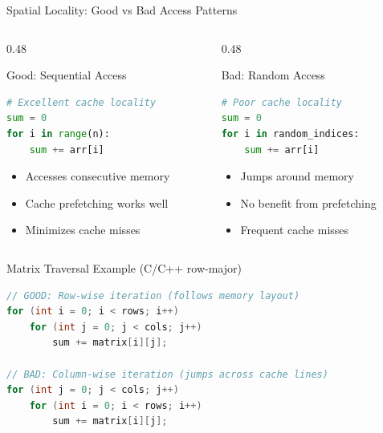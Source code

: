 \documentclass[aspectratio=169,xcolor=dvipsnames]{beamer}
\begin{document}
\begin{frame}[fragile]{Spatial Locality: Good vs Bad Access Patterns}
  \begin{columns}
    \begin{column}{0.48\textwidth}
      \begin{exampleblock}{Good: Sequential Access}
        \begin{lstlisting}[language=Python,basicstyle=\small\ttfamily]
# Excellent cache locality
sum = 0
for i in range(n):
    sum += arr[i]
        \end{lstlisting}

        \vspace{0.2cm}

        \begin{itemize}
          \item Accesses consecutive memory
          \item Cache prefetching works well
          \item Minimizes cache misses
        \end{itemize}
      \end{exampleblock}
    \end{column}
    \begin{column}{0.48\textwidth}
      \begin{alertblock}{Bad: Random Access}
        \begin{lstlisting}[language=Python,basicstyle=\small\ttfamily]
# Poor cache locality
sum = 0
for i in random_indices:
    sum += arr[i]
        \end{lstlisting}

        \vspace{0.2cm}

        \begin{itemize}
          \item Jumps around memory
          \item No benefit from prefetching
          \item Frequent cache misses
        \end{itemize}
      \end{alertblock}
    \end{column}
  \end{columns}

  \vspace{0.5cm}

  \begin{block}{Matrix Traversal Example (C/C++ row-major)}
    \begin{lstlisting}[language=C++,basicstyle=\tiny\ttfamily]
// GOOD: Row-wise iteration (follows memory layout)
for (int i = 0; i < rows; i++)
    for (int j = 0; j < cols; j++)
        sum += matrix[i][j];

// BAD: Column-wise iteration (jumps across cache lines)
for (int j = 0; j < cols; j++)
    for (int i = 0; i < rows; i++)
        sum += matrix[i][j];
    \end{lstlisting}
  \end{block}
\end{frame}
\end{document}
